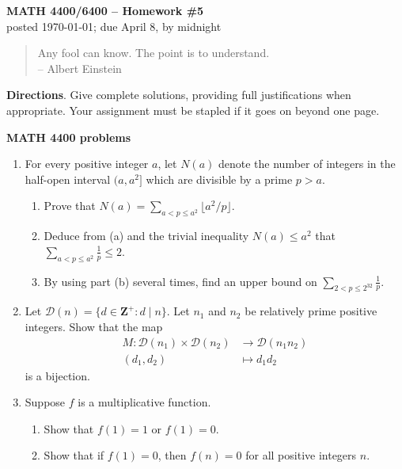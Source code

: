 \documentclass[12pt]{article}
\def\Z{\mathbf{Z}}
\begin{document}
\thispagestyle{empty} \begin{center} {\textbf{MATH 4400/6400 --
Homework \#5}\\ posted \today; due April 8, by midnight}
\end{center}

{\scriptsize \begin{quote} Any fool can know. The point is to understand.\\
    -- Albert Einstein\end{quote}}

 
\vskip 10pt \noindent\textbf{Directions}. Give complete solutions, providing full justifications when appropriate. Your assignment must be stapled if it goes on beyond one page.

\vskip 10pt \noindent\textbf{MATH 4400 problems}
\begin{enumerate}
\item For every positive integer $a$, let $N(a)$ denote the number of integers in the half-open interval $(a,a^2]$ which are divisible by a prime $p > a$.
\begin{enumerate}
\item Prove that $\displaystyle N(a) = \sum_{a < p \le a^2} \lfloor a^2/p\rfloor$.
\item Deduce from (a) and the trivial inequality $N(a) \le a^2$ that $\displaystyle \sum_{a < p \le a^2} \frac{1}{p} \le 2$.
\item By using part (b) several times, find an upper bound on $\displaystyle\sum_{2 < p \le 2^{32}} \frac{1}{p}$.
\end{enumerate}

\item Let $\mathcal{D}(n) = \{d \in \Z^{+}: d \mid n\}$. Let $n_1$ and $n_2$ be relatively prime positive integers. Show that the map
\begin{align*} M\colon \mathcal{D}(n_1) \times \mathcal{D}(n_2) &\to \mathcal{D}(n_1 n_2) \\
    (d_1,d_2) &\mapsto d_1d_2
\end{align*}
is a bijection.

\item Suppose $f$ is a multiplicative function.
\begin{enumerate}
\item Show that $f(1) = 1$ or $f(1)=0$.
\item Show that if $f(1)=0$, then $f(n)=0$ for all positive integers $n$.
\end{enumerate}


\end{enumerate}
\end{document}
